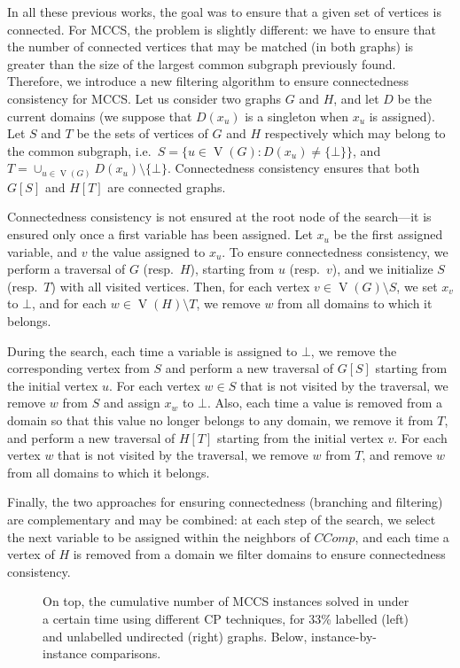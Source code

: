 \documentclass{llncs}
\begin{document}
In all these previous works, the goal was to ensure that a given set of vertices is connected. For
MCCS, the problem is slightly different: we have to ensure that the number of connected vertices
that may be matched (in both graphs) is greater than the size of the largest common subgraph
previously found. Therefore, we introduce a new filtering algorithm to ensure connectedness
consistency for MCCS.  Let us consider two graphs $G$ and $H$, and let $D$ be the current domains
(we suppose that $D(x_u)$ is a singleton when $x_u$ is assigned). Let $S$ and $T$ be the sets of
vertices of $G$ and $H$ respectively which may belong to the common subgraph, i.e.\ $S=\{ u\in
\operatorname{V}(G) : D(x_u)\neq\{\bot\}\}$, and $T = \cup_{u\in \operatorname{V}(G)} D(x_u)
\setminus \{ \bot \}$. Connectedness consistency ensures that both $G[S]$ and $H[T]$ are
connected graphs.

Connectedness consistency is not ensured at the root node of the search---it is ensured only once a
first variable has been assigned. Let $x_u$ be the first assigned variable, and $v$ the value
assigned to $x_u$. To ensure connectedness consistency, we perform a traversal of $G$ (resp.\ $H$),
starting from $u$ (resp.\ $v$), and we initialize $S$ (resp.\ $T$) with all visited vertices. Then,
for each vertex $v\in \operatorname{V}(G) \setminus S$, we set $x_v$ to $\bot$, and for each $w
\in \operatorname{V}(H) \setminus T$, we remove $w$ from all domains to which it belongs.

During the search, each time a variable is assigned to $\bot$, we remove the corresponding vertex
from $S$ and perform a new traversal of $G[S]$ starting from the initial vertex $u$. For each vertex
$w\in S$ that is not visited by the traversal, we remove $w$ from $S$ and assign $x_w$ to $\bot$.
Also, each time a value is removed from a domain so that this value no longer belongs to any domain,
we remove it from $T$, and perform a new traversal of $H[T]$ starting from the initial vertex $v$.
For each vertex $w$ that is not visited by the traversal, we remove $w$ from $T$, and remove $w$
from all domains to which it belongs.

Finally, the two approaches for ensuring connectedness (branching and filtering) are complementary
and may be combined: at each step of the search, we select the next variable to be assigned within
the neighbors of $\mathit{CComp}$, and each time a vertex of $H$ is removed from a domain we filter
domains to ensure connectedness consistency.

\begin{figure}[tb]
    \centering
    

    \vspace*{0.5em}
    \centering
    
    \caption{On top, the cumulative number of MCCS instances solved in under a certain time using
        different CP techniques, for 33\% labelled (left) and unlabelled undirected (right) graphs.
    Below, instance-by-instance comparisons.}
        \label{figure:connected-cp}
\end{figure}
\end{document}
